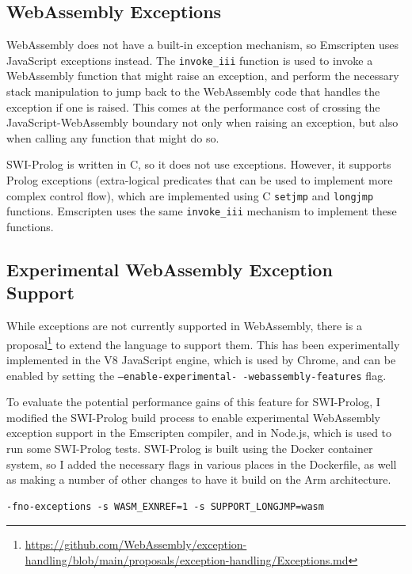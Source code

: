 \subsection{WebAssembly Exceptions}

WebAssembly does not have a built-in exception mechanism, so Emscripten uses JavaScript exceptions instead. The \texttt{invoke\_iii} function is used to invoke a WebAssembly function that might raise an exception, and perform the necessary stack manipulation to jump back to the WebAssembly code that handles the exception if one is raised. This comes at the performance cost of crossing the JavaScript-WebAssembly boundary not only when raising an exception, but also when calling any function that might do so.

SWI-Prolog is written in C, so it does not use exceptions. However, it supports Prolog exceptions (extra-logical predicates that can be used to implement more complex control flow), which are implemented using C \texttt{setjmp} and \texttt{longjmp} functions. Emscripten uses the same \texttt{invoke\_iii} mechanism to implement these functions.

\subsection{Experimental WebAssembly Exception Support}

While exceptions are not currently supported in WebAssembly, there is a proposal\footnote{\url{https://github.com/WebAssembly/exception-handling/blob/main/proposals/exception-handling/Exceptions.md}} to extend the language to support them. This has been experimentally implemented in the V8 JavaScript engine, which is used by Chrome, and can be enabled by setting the \texttt{--enable-experimental- -webassembly-features} flag.

To evaluate the potential performance gains of this feature for SWI-Prolog, I modified the SWI-Prolog build process to enable experimental WebAssembly exception support in the Emscripten compiler, and in Node.js, which is used to run some SWI-Prolog tests. SWI-Prolog is built using the Docker container system, so I added the necessary flags in various places in the Dockerfile, as well as making a number of other changes to have it build on the Arm architecture.

\begin{verbatim}
-fno-exceptions -s WASM_EXNREF=1 -s SUPPORT_LONGJMP=wasm
\end{verbatim}

